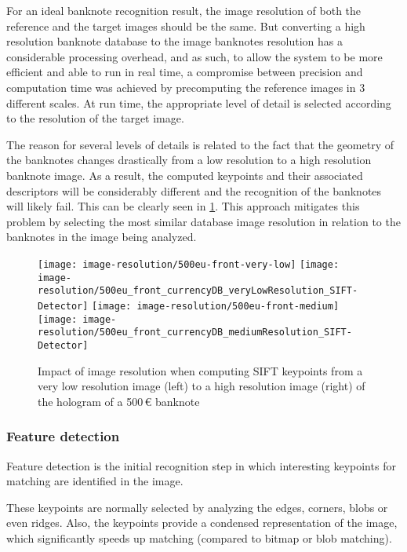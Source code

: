 For an ideal banknote recognition result, the image resolution of both the reference and the target images should be the same. But converting a high resolution banknote database to the image banknotes resolution has a considerable processing overhead, and as such, to allow the system to be more efficient and able to run in real time, a compromise between precision and computation time was achieved by precomputing the reference images in 3 different scales. At run time, the appropriate level of detail is selected according to the resolution of the target image.

The reason for several levels of details is related to the fact that the geometry of the banknotes changes drastically from a low resolution to a high resolution banknote image. As a result, the computed keypoints and their associated descriptors will be considerably different and the recognition of the banknotes will likely fail. This can be clearly seen in \cref{fig:banknote-500-front-resolution-difference}. This approach mitigates this problem by selecting the most similar database image resolution in relation to the banknotes in the image being analyzed.

\begin{figure}[H]
	\centering
	\texttt{[image: image-resolution/500eu-front-very-low]}\hfill
	\texttt{[image: image-resolution/500eu\_front\_currencyDB\_veryLowResolution\_SIFT-Detector]}\hfill
	\texttt{[image: image-resolution/500eu-front-medium]}\hfill
	\texttt{[image: image-resolution/500eu\_front\_currencyDB\_mediumResolution\_SIFT-Detector]}
	\caption{Impact of image resolution when computing SIFT keypoints from a very low resolution image (left) to a high resolution image (right) of the hologram of a 500\,\euro{} banknote}
	\label{fig:banknote-500-front-resolution-difference}
\end{figure}


\subsubsection{Feature detection}\label{sec:feature-detection}
Feature detection is the initial recognition step in which interesting keypoints for matching are identified in the image.

These keypoints are normally selected by analyzing the edges, corners, blobs or even ridges. Also, the keypoints provide a condensed representation of the image, which significantly speeds up matching (compared to bitmap or blob matching).

